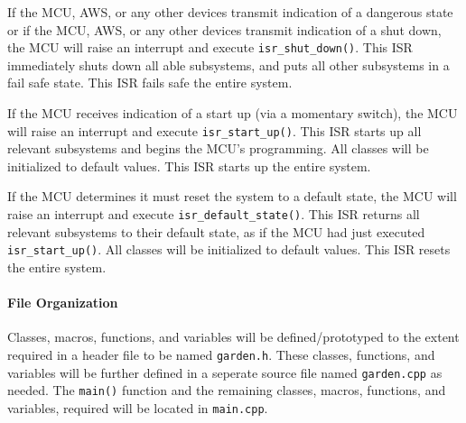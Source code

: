 If the MCU, AWS, or any other devices transmit indication of a dangerous
state or if the MCU, AWS, or any other devices transmit indication of a
shut down, the MCU will raise an interrupt and execute
\texttt{isr\_shut\_down()}. This ISR immediately shuts down all able
subsystems, and puts all other subsystems in a fail safe state. This ISR
fails safe the entire system.

If the MCU receives indication of a start up (via a momentary switch), the
MCU will raise an interrupt and execute \texttt{isr\_start\_up()}. This ISR
starts up all relevant subsystems and begins the MCU's programming. All
classes will be initialized to default values. This ISR starts up the
entire system.

If the MCU determines it must reset the system to a default state, the
MCU will raise an interrupt and execute \texttt{isr\_default\_state()}.
This ISR returns all relevant subsystems to their default state,
as if the MCU had just executed \texttt{isr\_start\_up()}. All classes will
be initialized to default values. This ISR resets the entire system.

\paragraph{File Organization}
Classes, macros, functions, and variables will be defined/prototyped to the
extent required in a header file to be named \texttt{garden.h}. These
classes, functions, and variables will be further defined in a seperate
source file named \texttt{garden.cpp} as needed. The \texttt{main()}
function and the remaining classes, macros, functions, and variables,
required will be located in \texttt{main.cpp}.

